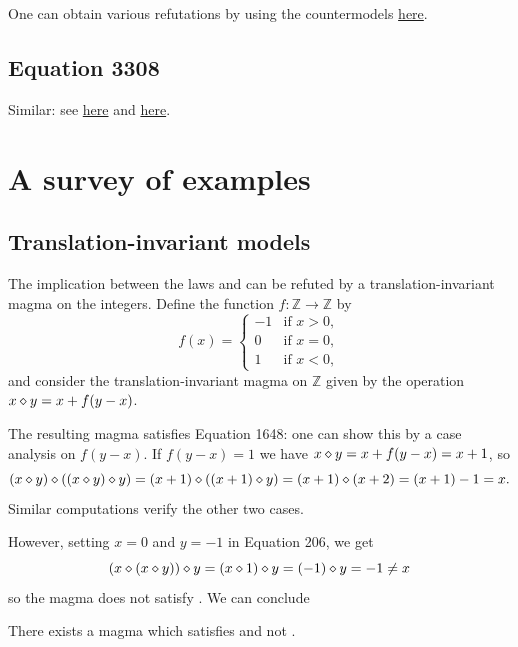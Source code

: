 One can obtain various refutations by using the countermodels \href{https://leanprover.zulipchat.com/#narrow/channel/458659-Equational/topic/713.2C.201289.2C.201447/near/483735768}{here}.
\subsection{Equation 3308}

Similar: see \href{https://leanprover.zulipchat.com/#narrow/channel/458659-Equational/topic/713.2C.201289.2C.201447/near/482066500}{here} and \href{https://leanprover.zulipchat.com/#narrow/channel/458659-Equational/topic/713.2C.201289.2C.201447/near/483735768}{here}.


\section{A survey of examples}\label{infinite-examples-section}

\subsection{Translation-invariant models}

The implication between the laws  and  can be refuted by a translation-invariant
magma on the integers. Define the function $f: \mathbb{Z} \to \mathbb{Z}$ by
$$f(x) =
\begin{cases}
  -1  & \text{if } x > 0, \\
   0  & \text{if } x = 0, \\
   1  & \text{if } x < 0,
\end{cases}$$
and consider the translation-invariant magma on $\mathbb{Z}$ given by the operation $x \diamond y = x + f(y-x)$.

The resulting magma satisfies Equation 1648: one can show this by a case analysis on $f(y-x)$. If $f(y-x)=1$ we have $x \diamond y = x + f(y-x) = x + 1$, so
$$(x \diamond y) \diamond ((x \diamond y) \diamond y) = (x + 1) \diamond ((x + 1) \diamond y) = (x + 1) \diamond (x + 2) = (x + 1) - 1 = x.$$
Similar computations verify the other two cases.

However, setting $x=0$ and $y=-1$ in Equation 206, we get
$$(x \diamond (x \diamond y)) \diamond y = (x \diamond 1) \diamond y = (-1) \diamond y = -1 \neq x$$
so the magma does not satisfy . We can conclude

\begin{theorem}\label{non_imp_1648_206_thm}
  \leanok
  There exists a magma which satisfies  and not .
\end{theorem}

